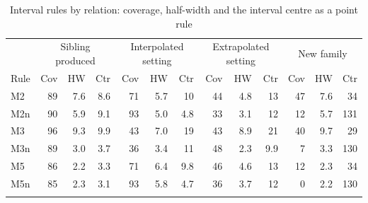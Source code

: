 \documentclass[pdflatex,sn-basic,lineno]{sn-jnl}
\newcommand{\tabsizesmall}{\footnotesize}%
\begin{document}
\begin{appendices}
\begin{table}[p]
\tabsizesmall
\setlength{\tabcolsep}{2.6pt}
\caption{Interval rules by relation: coverage, half-width and the interval centre as a point rule}\label{tab:intervals}
\begin{tabular*}{\textwidth}{@{\extracolsep{\fill}}lrrrrrrrrrrrr@{}}
\toprule
 & \multicolumn{3}{c}{Sibling produced} & \multicolumn{3}{c}{Interpolated setting} & \multicolumn{3}{c}{Extrapolated setting} & \multicolumn{3}{c}{New family} \\
\cmidrule(lr){2-4}\cmidrule(lr){5-7}\cmidrule(lr){8-10}\cmidrule(lr){11-13}
Rule & Cov & HW & Ctr & Cov & HW & Ctr & Cov & HW & Ctr & Cov & HW & Ctr \\
\midrule
M2 & 89 & 7.6 & 8.6 & 71 & 5.7 & 10 & 44 & 4.8 & 13 & 47 & 7.6 & 34 \\
M2n & 90 & 5.9 & 9.1 & 93 & 5.0 & 4.8 & 33 & 3.1 & 12 & 12 & 5.7 & 131 \\
M3 & 96 & 9.3 & 9.9 & 43 & 7.0 & 19 & 43 & 8.9 & 21 & 40 & 9.7 & 29 \\
M3n & 89 & 3.0 & 3.7 & 36 & 3.4 & 11 & 48 & 2.3 & 9.9 & 7 & 3.3 & 130 \\
M5 & 86 & 2.2 & 3.3 & 71 & 6.4 & 9.8 & 46 & 4.6 & 13 & 12 & 2.3 & 34 \\
M5n & 85 & 2.3 & 3.1 & 93 & 5.8 & 4.7 & 36 & 3.7 & 12 & 0 & 2.2 & 130 \\
\botrule
\end{tabular*}
\end{table}


\end{appendices}
\end{document}
